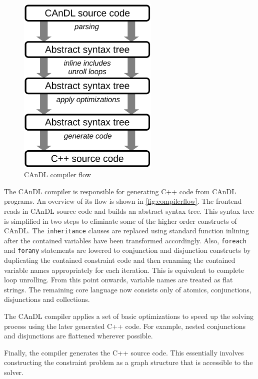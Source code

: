 \begin{figure}[t]
\centering
\includegraphics[width=0.6\textwidth]{figures/candlstages.pdf}
\caption{CAnDL compiler flow}
\label{fig:compilerflow}
\end{figure}

    The CAnDL compiler is responsible for generating C++ code from CAnDL
    programs.
    An overview of its  flow is shown in \autoref{fig:compilerflow}.
    The frontend reads in  CAnDL source code and builds an abstract syntax tree.
    This syntax tree is simplified in two steps to eliminate some of the higher
    order constructs of CAnDL.
    The \texttt{inheritance} clauses are replaced using standard function
    inlining after the contained variables have been transformed accordingly.
    Also, \texttt{foreach} and \texttt{forany} statements are lowered to
    conjunction and disjunction constructs by duplicating the contained
    constraint code and then renaming the contained variable names appropriately
    for each iteration.
    This is equivalent to complete loop unrolling.
    From this point onwards, variable names are treated as flat strings.
    The remaining core language now consists only of atomics, conjunctions,
    disjunctions and collections.

    The CAnDL compiler applies a set of basic optimizations to speed up the
    solving process using the later generated C++ code.
    For example, nested conjunctions and disjunctions are flattened wherever
    possible.

    Finally, the compiler generates the C++ source code.
    This essentially involves constructing the constraint problem as a graph
    structure that is accessible to the solver.

